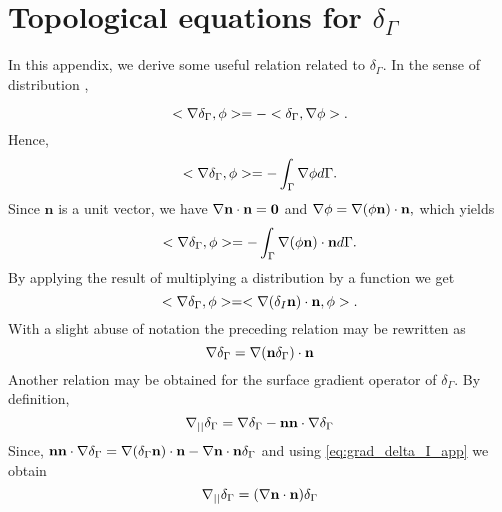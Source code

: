 \section{Topological equations for $\delta_\Gamma$}
\label{ap:delta_I}
In this appendix, we derive some useful relation related to $\delta_\Gamma$. In the sense of distribution \citep{appel2007}, 

\begin{equation}
<\mathbf{\nabla} \delta_\Gamma,\phi> = - <\delta_\Gamma,\mathbf{\nabla} \phi>.
\end{equation}
Hence,
\begin{equation}
<\mathbf{\nabla} \delta_\Gamma,\phi> = - \int_{\Gamma} \mathbf{\nabla} \phi d\Gamma.
\label{eq:1grad_delta_I}
\end{equation}
Since $\textbf{n}$ is a unit vector, we have $\mathbf{\nabla}  \textbf{n} \cdot \textbf{n} =\bm 0$ and%
$\mathbf{\nabla} \phi= \mathbf{\nabla}  (\phi \textbf{n}) \cdot \textbf{n},$
which yields 
\begin{equation}
<\mathbf{\nabla} \delta_\Gamma,\phi> = - \int_{\Gamma} \mathbf{\nabla}  (\phi \textbf{n}) \cdot \textbf{n} d\Gamma. 
\end{equation}
By applying the result of multiplying a distribution by a function we get \citep{appel2007} %
\begin{equation}
<\mathbf{\nabla} \delta_\Gamma,\phi> = <\mathbf{\nabla}  (\delta _I \textbf{n}) \cdot \textbf{n},\phi>.
\end{equation}
With a slight abuse of notation the preceding relation may be rewritten as
\begin{equation}
    \mathbf{\nabla}\delta_\Gamma 
    =   \mathbf{\nabla}  (\textbf{n} \delta_\Gamma) \cdot \textbf{n}
    \label{eq:grad_delta_I_app}
\end{equation}
Another relation may be obtained for the surface gradient operator of $\delta_\Gamma$. By definition,
\begin{equation}
  \mathbf{\nabla}_{||} \delta_\Gamma  = \mathbf{\nabla}\delta_\Gamma - \textbf{nn}\cdot\mathbf{\nabla}\delta_\Gamma
\end{equation}
Since, $\textbf{nn}\cdot\mathbf{\nabla}\delta_\Gamma = \mathbf{\nabla}  (\delta_\Gamma\textbf{n})\cdot \textbf{n}-\mathbf{\nabla} \textbf{n}\cdot \textbf{n} \delta_\Gamma$ and using \ref{eq:grad_delta_I_app} we obtain
\begin{equation}
  \mathbf{\nabla}_{||} \delta_\Gamma  = (\mathbf{\nabla} \textbf{n}\cdot \textbf{n}) \delta_\Gamma
\label{eq:gradI_deltaI}
\end{equation}


